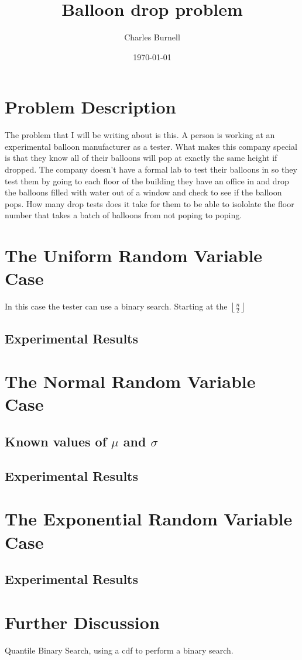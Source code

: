 \documentclass{article}
\title{Balloon drop problem}
\author{Charles Burnell}
\date{\today}
\providecommand{\myfloor}[1]{\left \lfloor #1 \right \rfloor }
\begin{document}
\maketitle
\section*{Problem Description}
The problem that I will be writing about is this. A person is working at an experimental balloon manufacturer as a tester. What makes this company special is that they know all of their balloons will pop at exactly the same height if dropped. The company doesn't have a formal lab to test their balloons in so they test them by going to each floor of the building they have an office in and drop the balloons filled with water out of a window and check to see if the balloon pops. How many drop tests does it take for them to be able to isololate the floor number that takes a batch of balloons from not poping to poping.\\

\section*{The Uniform Random Variable Case}
In this case the tester can use a binary search. Starting at the $\myfloor{\frac{n}{2}}$

\subsection*{Experimental Results}

\section*{The Normal Random Variable Case}
\subsection*{Known values of $\mu$ and $\sigma$}

\subsection*{Experimental Results}

\section*{The Exponential Random Variable Case}

\subsection*{Experimental Results}

\section*{Further Discussion}
Quantile Binary Search, using a cdf to perform a binary search.
\end{document}

